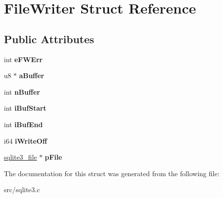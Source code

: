 \hypertarget{struct_file_writer}{\section{File\-Writer Struct Reference}
\label{struct_file_writer}
}
\subsection*{Public Attributes}
\begin{DoxyCompactItemize}
\item 
\hypertarget{struct_file_writer_a9d6206477bbbd0ce69087c7f9946813d}{int {\bfseries e\-F\-W\-Err}}\label{struct_file_writer_a9d6206477bbbd0ce69087c7f9946813d}

\item 
\hypertarget{struct_file_writer_a0b1f871754a66f029bb91e497dcc7b73}{u8 $\ast$ {\bfseries a\-Buffer}}\label{struct_file_writer_a0b1f871754a66f029bb91e497dcc7b73}

\item 
\hypertarget{struct_file_writer_af2dceb2795ba9edef0158601922448e3}{int {\bfseries n\-Buffer}}\label{struct_file_writer_af2dceb2795ba9edef0158601922448e3}

\item 
\hypertarget{struct_file_writer_a64ce30042d13eeb585998f5648a6a5a8}{int {\bfseries i\-Buf\-Start}}\label{struct_file_writer_a64ce30042d13eeb585998f5648a6a5a8}

\item 
\hypertarget{struct_file_writer_ad38aa3b0a138de0c419f72c0c8994375}{int {\bfseries i\-Buf\-End}}\label{struct_file_writer_ad38aa3b0a138de0c419f72c0c8994375}

\item 
\hypertarget{struct_file_writer_ade3665625c8607582daa7130d7a2683f}{i64 {\bfseries i\-Write\-Off}}\label{struct_file_writer_ade3665625c8607582daa7130d7a2683f}

\item 
\hypertarget{struct_file_writer_a24a75f5d5d088a809c1e811154912e33}{\hyperlink{structsqlite3__file}{sqlite3\-\_\-file} $\ast$ {\bfseries p\-File}}\label{struct_file_writer_a24a75f5d5d088a809c1e811154912e33}

\end{DoxyCompactItemize}


The documentation for this struct was generated from the following file\-:\begin{DoxyCompactItemize}
\item 
src/sqlite3.\-c\end{DoxyCompactItemize}
